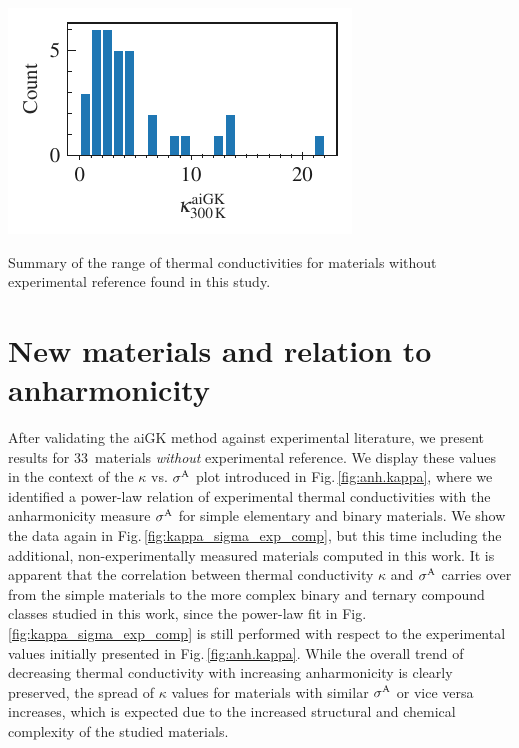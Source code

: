 %
\begin{marginfigure}
	\includegraphics[width=\textwidth]{./data/plots/kappa_histogram/histogram.pdf}
	\caption{Summary of the range of thermal conductivities for materials without experimental reference found in this study.}
	\label{fig:kappa_wo_exp_hist}
\end{marginfigure}


\section{New materials and relation to anharmonicity}
\label{sec:results.new}
After validating the aiGK method against experimental literature, we present results for 33~materials \emph{without} experimental reference. We display these values in the context of the $\kappa$ vs. $\sigma^\mathrm{A}$ plot introduced in Fig.\,\ref{fig:anh.kappa}, where we identified a power-law relation of experimental thermal conductivities with the anharmonicity measure $\sigma^\mathrm{A}$ for simple elementary and binary materials. We show the data again in Fig.\,\ref{fig:kappa_sigma_exp_comp}, but this time including the additional, non-experimentally measured materials computed in this work.
%
It is apparent that the correlation between thermal conductivity $\kappa$ and $\sigma^\mathrm{A}$ carries over from the simple materials to the more complex binary and ternary compound classes studied in this work, since the power-law fit in Fig.\,\ref{fig:kappa_sigma_exp_comp} is still performed with respect to the experimental values initially presented in Fig.\,\ref{fig:anh.kappa}. While the overall trend of decreasing thermal conductivity with increasing anharmonicity is clearly preserved, the spread of $\kappa$ values for materials with similar $\sigma^\mathrm{A}$ or vice versa increases, which is expected due to the increased structural and chemical complexity of the studied materials.

